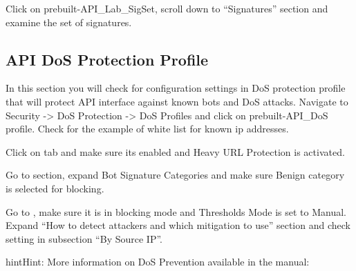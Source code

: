 \documentclass[letterpaper,10pt,english]{sphinxmanual}
\def\backcoverpage{
  \newpage
  \thispagestyle{empty}
  \phantom{100}
  \ThisURCornerWallPaper{1.0}{back_cover}
}
\begin{document}
\noindent{}

Click on prebuilt-API\_Lab\_SigSet, scroll down to “Signatures” section and examine the set of signatures.


\subsection{API DoS Protection Profile}
\label{\detokenize{class2/module2/module2:api-dos-protection-profile}}
In this section you will check for configuration settings in DoS protection profile that will protect API interface against known bots and DoS attacks.
Navigate to Security -\textgreater{} DoS Protection -\textgreater{} DoS Profiles and click on prebuilt-API\_DoS profile. Check for the example of white list for known ip addresses.

\noindent{}

Click on  tab and make sure its enabled and Heavy URL Protection is activated.

\noindent{}

Go to  section, expand Bot Signature Categories and make sure Benign category is selected for blocking.

Go to , make sure it is in blocking mode and Thresholds Mode is set to Manual. Expand “How to detect attackers and which mitigation to use” section and check setting in subsection “By Source IP”.

\noindent{}

\begin{sphinxadmonition}{hint}{Hint:}
More information on DoS Prevention available in the manual:

\end{sphinxadmonition}



\renewcommand{\indexname}{Index}

\backcoverpage
\end{document}
